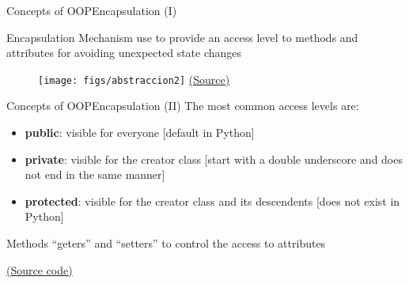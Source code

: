 \documentclass[10pt,compress]{beamer} %
\begin{document}
\begin{frame}{Concepts of OOP}{Encapsulation (I)}
	\begin{block}{Encapsulation}
		Mechanism use to provide an access level to methods and attributes for avoiding unexpected state changes
  	\end{block}	

	\begin{figure}
		\texttt{[image: figs/abstraccion2]}
		\scriptsize \href{http://www.onlinebuff.com}{(Source)}
	\end{figure}
\end{frame}

\begin{frame}{Concepts of OOP}{Encapsulation (II)}
    The most common access levels are:
	
	\begin{itemize}
		\item \textbf{public}: visible for everyone  [default in Python]
		\item \textbf{private}: visible for the creator class [start with a double underscore and does not end in the same manner]
		\item \textbf{protected}: visible for the creator class and its descendents \alert{[does not exist in Python]}
	\end{itemize}

     Methods ``geters'' and ``setters'' to control the access to attributes
\end{frame}

\begin{frame}[plain]%
	\begin{exampleblock}{}
	\vspace{-0.3cm} 
		
	\end{exampleblock}

	\href{https://gist.github.com/dfbarrero/a6ebc6632fb9fe06a2c8c6a47a465ab5}{(Source code)}
\end{frame}

%		
\end{document}

